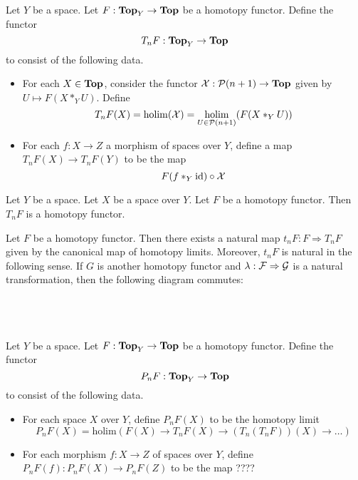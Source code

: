 \documentclass[a4paper]{article}
\begin{document}
\begin{defn}{}{} Let $Y$ be a space. Let $F:\bold{Top}_Y\to\bold{Top}$ be a homotopy functor. Define the functor $$T_nF:\bold{Top}_Y\to\bold{Top}$$ to consist of the following data. 
\begin{itemize}
\item For each $X\in\bold{Top}$, consider the functor $\mathcal{X}:\mathcal{P}(n+1)\to\bold{Top}$ given by $U\mapsto F(X\ast_YU)$. Define $$T_nF(X)=\operatorname*{holim}(\mathcal{X})=\operatorname*{holim}_{U\in\mathcal{P}(n+1)}(F(X\ast_YU))$$
\item For each $f:X\to Z$ a morphism of spaces over $Y$, define a map $T_nF(X)\to T_nF(Y)$ to be the map $$F(f\ast_Y\text{id})\circ\mathcal{X}$$
\end{itemize}
\end{defn}

\begin{lmm}{}{} Let $Y$ be a space. Let $X$ be a space over $Y$. Let $F$ be a homotopy functor. Then $T_nF$ is a homotopy functor.   
\end{lmm}

\begin{prp}{}{} Let $F$ be a homotopy functor. Then there exists a natural map $t_nF:F\Rightarrow T_nF$ given by the canonical map of homotopy limits. Moreover, $t_nF$ is natural in the following sense. If $G$ is another homotopy functor and $\lambda:\mathcal{F}\Rightarrow\mathcal{G}$ is a natural transformation, then the following diagram commutes: \\~\\
\\~\\
\end{prp}

\begin{defn}{}{} Let $Y$ be a space. Let $F:\bold{Top}_Y\to\bold{Top}$ be a homotopy functor. Define the functor $$P_nF:\bold{Top}_Y\to\bold{Top}$$ to consist of the following data. 
\begin{itemize}
\item For each space $X$ over $Y$, define $P_nF(X)$ to be the homotopy limit $$P_nF(X)=\text{holim}(F(X)\to T_nF(X)\to(T_n(T_nF))(X)\to\dots)$$
\item For each morphism $f:X\to Z$ of spaces over $Y$, define $P_nF(f):P_nF(X)\to P_nF(Z)$ to be the map ????
\end{itemize}
\end{defn}
\end{document}
